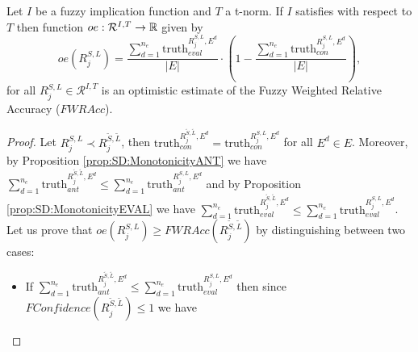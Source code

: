 \begin{proposition}\label{prop:OE:FWRAcc}
	Let $I$ be a fuzzy implication function and $T$ a t-norm. If $I$ satisfies \MTC with respect to $T$ then function $oe: \mathcal{R}^{I,T} \to \mathbb{R}$ given by
	\begin{equation}\label{eq:OEWRAcc}
	oe(R^{S,L}_j)= \frac{\displaystyle \sum_{d=1}^{n_e} \text{truth}_{eval}^{R^{S,L}_j,E^d}}{|E|} \cdot \left(1-\frac{\displaystyle \sum_{d=1}^{n_e}\text{truth}_{con}^{R^{S,L}_j,E^d}}{|E|}\right),
	\end{equation}
	for all $R^{S,L}_j \in \mathcal{R}^{I,T}$ is an optimistic estimate of the Fuzzy Weighted Relative Accuracy ($FWRAcc$).
\end{proposition}

\begin{proof}
Let $R^{S,L}_j \prec R^{\tilde{S},\tilde{L}}_{j}$, then $\text{truth}_{con}^{R^{\tilde{S},\tilde{L}}_j,E^d} = \text{truth}_{con}^{R^{S,L}_j,E^d}$ for all $E^d \in E$. Moreover, by Proposition \ref{prop:SD:MonotonicityANT} we have $\displaystyle \sum_{d=1}^{n_e}\text{truth}_{ant}^{R^{\tilde{S},\tilde{L}}_{j},E^d} \leq \sum_{d=1}^{n_e} \text{truth}_{ant}^{R^{S,L}_j,E^d}$ and by Proposition \ref{prop:SD:MonotonicityEVAL} we have $\displaystyle \sum_{d=1}^{n_e}\text{truth}_{eval}^{R^{\tilde{S},\tilde{L}}_{j},E^d} \leq \sum_{d=1}^{n_e} \text{truth}_{eval}^{R^{S,L}_j,E^d}$. Let us prove that $oe(R^{S,L}_j) \geq FWRAcc(R^{\tilde{S},\tilde{L}}_{j})$ by distinguishing between two cases:
\begin{itemize}
	\item If $\displaystyle \sum_{d=1}^{n_e}\text{truth}_{ant}^{R^{\tilde{S},\tilde{L}}_{j},E^d} \leq \sum_{d=1}^{n_e} \text{truth}_{eval}^{R^{S,L}_j,E^d}$ then since $FConfidence(R^{\tilde{S},\tilde{L}}_{j}) \leq 1$ we have
	

\end{itemize}
\end{proof}
